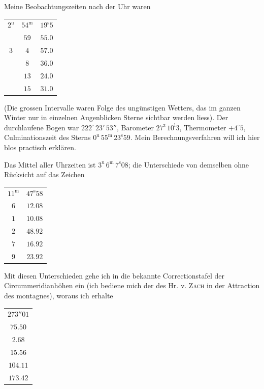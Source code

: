 \par\indent Meine Beobachtungszeiten nach der Uhr waren

\begin{center}\fontsize{10}{12}\selectfont\setlength{\tabcolsep}{3pt}\begin{tabular}{ccc}
$2^{\mathrm u}$ & $54^{\mathrm m}$ & $19^{\mathrm s}5$\\
 & $59$ & $55.0$\\
$3$ & $4$ & $57.0$\\
 & $8$ & $36.0$\\
 & $13$ & $24.0$\\
 & $15$ & $31.0$\\
\end{tabular}\end{center}

\par\indent (Die grossen Intervalle waren Folge des ungünstigen Wetters, das im ganzen Winter nur in einzelnen Augenblicken Sterne sichtbar werden liess). Der durchlaufene Bogen war $222^\circ\,23'\,53''$, Barometer $27^{\mathrm z}\,10^{\mathrm l}3$, Thermometer $+4^\circ5$, Culminationszeit des Sterns $0^{\mathrm u}\,55^{\mathrm m}\,23^{\mathrm s}59$. Mein Berechnungsverfahren will ich hier blos practisch erklären.

\par\indent Das Mittel aller Uhrzeiten ist $3^{\mathrm u}\,6^{\mathrm m}\,7^{\mathrm s}08$; die Unterschiede von demselben ohne Rücksicht auf das Zeichen

\begin{center}\fontsize{10}{12}\selectfont\setlength{\tabcolsep}{3pt}\begin{tabular}{cc}
$11^{\mathrm m}$ & $47^{\mathrm s}58$\\
$6$ & $12.08$\\
$1$ & $10.08$\\
$2$ & $48.92$\\
$7$ & $16.92$\\
$9$ & $23.92$\\
\end{tabular}\end{center}

\par\indent Mit diesen Unterschieden gehe ich in die bekannte Correctionstafel der Circummeridianhöhen ein (ich bediene mich der des Hr. v. \textsc{Zach} in der Attraction des montagnes), woraus ich erhalte

\begin{center}\fontsize{10}{12}\selectfont\setlength{\tabcolsep}{3pt}\begin{tabular}{c}
$273''01$\\
$75.50$\\
$2.68$\\
$15.56$\\
$104.11$\\
$173.42$\\
\end{tabular}\end{center}

